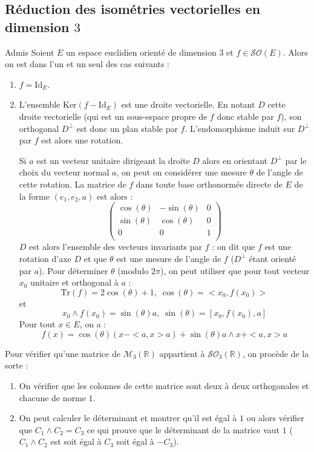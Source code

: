 \documentclass[french,11pt,twoside]{VcCours}
\begin{document}
\subsection{Réduction des isométries vectorielles en dimension \texorpdfstring{$3$}{3}}
\begin{Theoreme}{Admis} Soient $E$ un espace euclidien orienté de dimension $3$ et $f \in \mathcal{SO}(E)$. Alors on est dans l'un et un seul des cas suivants :
\begin{enumerate}
\item $f= \textrm{Id}_E$.
\item L'ensemble $\textrm{Ker}(f - \textrm{Id}_E)$ est une droite vectorielle. En notant $D$ cette droite vectorielle (qui est un sous-espace propre de $f$ donc stable par $f$), son orthogonal $D^{\perp}$ est donc un plan stable par $f$. L'endomorphisme induit sur $D^{\perp}$ par $f$ est alors une rotation.

\medskip

Si $a$ est un vecteur unitaire dirigeant la droite $D$ alors en orientant $D^{\perp}$ par le choix du vecteur normal $a$, on peut on considérer une mesure $\theta$ de l'angle de cette rotation. La matrice de $f$ dans toute base orthonormée directe de $E$ de la forme $(e_1,e_2,a)$ est alors :
$$ \begin{pmatrix}
\cos(\theta) & -\sin(\theta) & 0 \\
\sin(\theta) & \cos(\theta) & 0 \\
0 & 0 & 1 \\
\end{pmatrix}$$
$D$ est alors l'ensemble des vecteurs invariants par $f$ : on dit que $f$ est une rotation d'axe $D$ et que $\theta$ est une mesure de l'angle de $f$ ($D^{\perp}$ étant orienté par $a$). Pour déterminer $\theta$ (modulo $2 \pi$), on peut utiliser que pour tout vecteur $x_0$ unitaire et orthogonal à $a$ :
$$ \textrm{Tr}(f) = 2 \cos(\theta)+1, \; \cos(\theta) = <x_0, f(x_0)>$$
et 
$$ x_0 \wedge f(x_0) = \sin(\theta) a , \; \sin(\theta) = [x_0, f(x_0),a]$$
Pour tout $x \in E$, on a :
$$ f(x) = \cos(\theta)(x-<a,x>a) + \sin(\theta) a \wedge x + <a,x>a$$
\end{enumerate}
\end{Theoreme}

\begin{Remarque}{} Pour vérifier qu'une matrice de $\mathcal{M}_3(\mathbb{R})$ appartient à $\mathcal{SO}_3(\mathbb{R})$, on procède de la sorte :
\begin{enumerate}
\item On vérifier que les colonnes de cette matrice sont deux à deux orthogonales et chacune de norme $1$.
\item On peut calculer le déterminant et montrer qu'il est égal à $1$ ou alors vérifier que $C_1 \wedge C_2 = C_3$ ce qui prouve que le déterminant de la matrice vaut $1$ ($C_1 \wedge C_2$ est soit égal à $C_3$ soit égal à $-C_3$).
\end{enumerate}
\end{Remarque}
\end{document}
